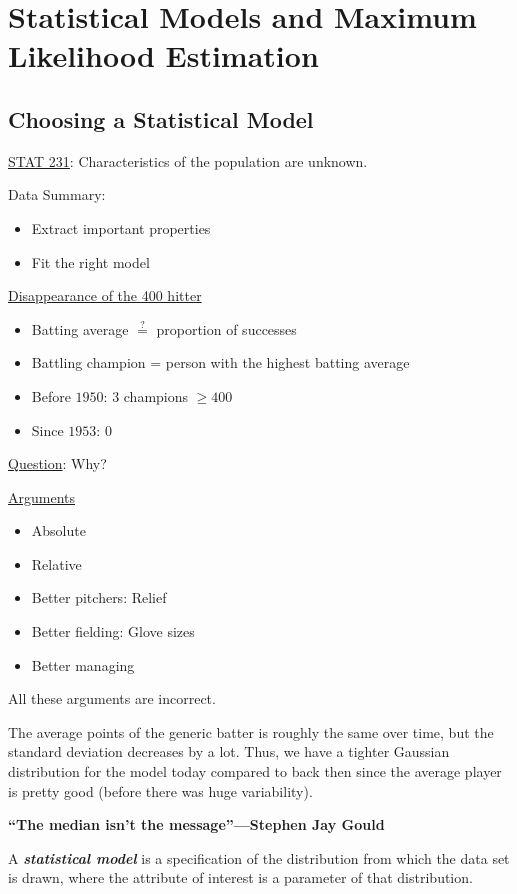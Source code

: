 \chapter{Statistical Models and Maximum Likelihood Estimation}

\section{Choosing a Statistical Model}

\underline{STAT 231}: Characteristics of the population
are unknown.

Data Summary:
\begin{itemize}
    \item Extract important properties
    \item Fit the right model
\end{itemize}

\underline{Disappearance of the 400 hitter}
\begin{itemize}
    \item Batting average $ \stackrel{?}{=} $ proportion of successes
    \item Battling champion = person with the highest batting average
    \item Before $ 1950 $: 3 champions $ \geqslant 400 $
    \item Since $ 1953 $: 0
\end{itemize}
\underline{Question}: Why?

\underline{Arguments}
\begin{itemize}
    \item Absolute
    \item Relative
    \item Better pitchers: Relief
    \item Better fielding: Glove sizes
    \item Better managing
\end{itemize}
All these arguments are incorrect.

The average points of the generic batter is roughly the same over time,
but the standard deviation decreases by a lot. Thus, we have a tighter Gaussian
distribution for the model today compared to back then since the average
player is pretty good (before there was huge variability).

\textbf{``The median isn't the message''---Stephen Jay Gould}

\begin{defbox}
    \begin{definition}
        A \textbf{\emph{statistical model}} is a specification of the
        distribution from which the data set is drawn, where the attribute of interest
        is a parameter of that distribution.
    \end{definition}
\end{defbox}

